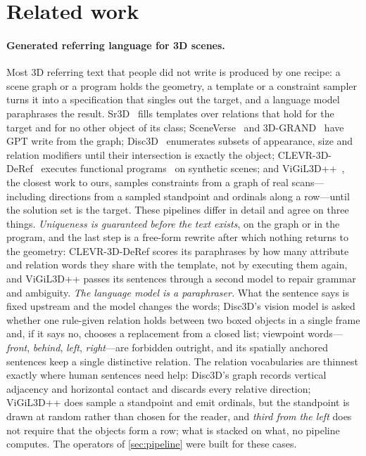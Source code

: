 \section{Related work}
\label{sec:related}

\paragraph{Generated referring language for 3D scenes.}
Most 3D referring text that people did not write is produced by one recipe: a scene graph or a program holds the geometry, a template or a constraint sampler turns it into a specification that singles out the target, and a language model paraphrases the result. Sr3D~\cite{referit3d} fills templates over relations that hold for the target and for no other object of its class; SceneVerse~\cite{sceneverse} and 3D-GRAND~\cite{3dgrand} have GPT write from the graph; Disc3D~\cite{disc3d} enumerates subsets of appearance, size and relation modifiers until their intersection is exactly the object; CLEVR-3D-DeRef~\cite{clevr3dderef} executes functional programs~\cite{clevrrefplus} on synthetic scenes; and ViGiL3D++~\cite{vigil3d,vigil3dpp}, the closest work to ours, samples constraints from a graph of real scans---including directions from a sampled standpoint and ordinals along a row---until the solution set is the target. These pipelines differ in detail and agree on three things.
\emph{Uniqueness is guaranteed before the text exists}, on the graph or in the program, and the last step is a free-form rewrite after which nothing returns to the geometry: CLEVR-3D-DeRef scores its paraphrases by how many attribute and relation words they share with the template, not by executing them again, and ViGiL3D++ passes its sentences through a second model to repair grammar and ambiguity.
\emph{The language model is a paraphraser.} What the sentence says is fixed upstream and the model changes the words; Disc3D's vision model is asked whether one rule-given relation holds between two boxed objects in a single frame and, if it says no, chooses a replacement from a closed list; viewpoint words---\emph{front}, \emph{behind}, \emph{left}, \emph{right}---are forbidden outright, and its spatially anchored sentences keep a single distinctive relation. The relation vocabularies are thinnest exactly where human sentences need help: Disc3D's graph records vertical adjacency and horizontal contact and discards every relative direction; ViGiL3D++ does sample a standpoint and emit ordinals, but the standpoint is drawn at random rather than chosen for the reader, and \emph{third from the left} does not require that the objects form a row; what is stacked on what, no pipeline computes. The operators of \cref{sec:pipeline} were built for these cases.
